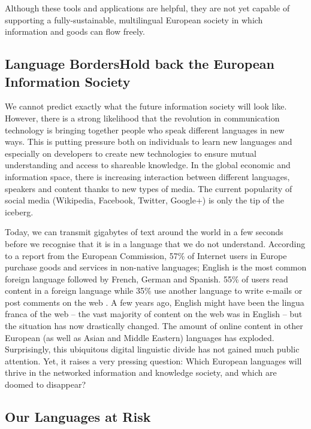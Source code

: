 \begin{multicols}{2}
Although these tools and applications are helpful, they are not yet capable of supporting a fully-sustainable, multilingual European society in which information and goods can flow freely.

\subsection[Language Borders Hold back the European Information Society]{Language Borders\newline Hold back the European Information Society}

We cannot predict exactly what the future information society will look like. However, there is a strong likelihood that the revolution in communication technology is bringing together people who speak different languages in new ways. This is putting pressure both on individuals to learn new languages and especially on developers to create new technologies to ensure mutual understanding and access to shareable knowledge. In the global economic and information space, there is increasing interaction between different languages, speakers and content thanks to new types of media. The current popularity of social media (Wikipedia, Facebook, Twitter, Google+) is only the tip of the iceberg.


Today, we can transmit gigabytes of text around the world in a few seconds before we recognise that it is in a language that we do not understand. According to a report from the European Commission, 57\% of Internet users in Europe purchase goods and services in non-native languages; English is the most common foreign language followed by French, German and Spanish. 55\% of users read content in a foreign language while 35\% use another language to write e-mails or post comments on the web \cite{EC1}. A few years ago, English might have been the lingua franca of the web -- the vast majority of content on the web was in English -- but the situation has now drastically changed. The amount of online content in other European (as well as Asian and Middle Eastern) languages has exploded.  Surprisingly, this ubiquitous digital linguistic divide has not gained much public attention. Yet, it raises a very pressing question: Which European languages will thrive in the networked information and knowledge society, and which are doomed to disappear?

\subsection{Our Languages at Risk}


\end{multicols}
